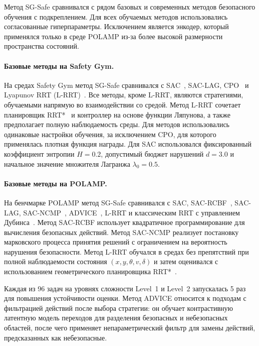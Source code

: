 Метод SG-Safe сравнивался с рядом базовых и современных методов безопасного обучения с подкреплением. Для всех обучаемых методов использовались согласованные гиперпараметры. Исключением является энкодер, который применялся только в среде POLAMP из-за более высокой размерности пространства состояний.

\paragraph{Базовые методы на Safety Gym.}

На средах Safety Gym метод SG-Safe сравнивался с SAC~\cite{haarnoja2018soft}, SAC-LAG, CPO~\cite{achiam2017cpo} и Lyapunov RRT (L-RRT)~\cite{lyapunovrrt}. Все методы, кроме L-RRT, являются стратегиями, обучаемыми напрямую во взаимодействии со средой. Метод L-RRT сочетает планировщик RRT*~\cite{karaman2011anytime} и контроллер на основе функции Ляпунова, а также предполагает полную наблюдаемость среды. Для методов использовались одинаковые настройки обучения, за исключением CPO, для которого применялась плотная функция награды. Для SAC использовался фиксированный коэффициент энтропии $H = 0.2$, допустимый бюджет нарушений $d = 3.0$ и начальное значение множителя Лагранжа $\lambda_0 = 0.5$.

\paragraph{Базовые методы на POLAMP.}

На бенчмарке POLAMP метод SG-Safe сравнивался с SAC, SAC-RCBF~\cite{sac-rcbf}, SAC-LAG, SAC-NCMP~\cite{huang2021risk}, ADVICE~\cite{advice}, L-RRT и классическим RRT с управлением Дубинса~\cite{DUBINS}. Метод SAC-RCBF использует квадратичное программирование для вычисления безопасных действий. Метод SAC-NCMP реализует постановку марковского процесса принятия решений с ограничением на вероятность нарушения безопасности. Метод L-RRT обучался в средах без препятствий при полной наблюдаемости состояния $(x, y, \theta, v, \delta)$ и затем оценивался с использованием геометрического планировщика RRT*~\cite{lyapunovrrt}.

Каждая из 96 задач на уровнях сложности Level~1 и Level~2 запускалась 5 раз для повышения устойчивости оценки. Метод ADVICE относится к подходам с фильтрацией действий после выбора стратегии: он обучает контрастивную латентную модель переходов для разделения безопасных и небезопасных областей, после чего применяет непараметрический фильтр для замены действий, предсказанных как небезопасные.

